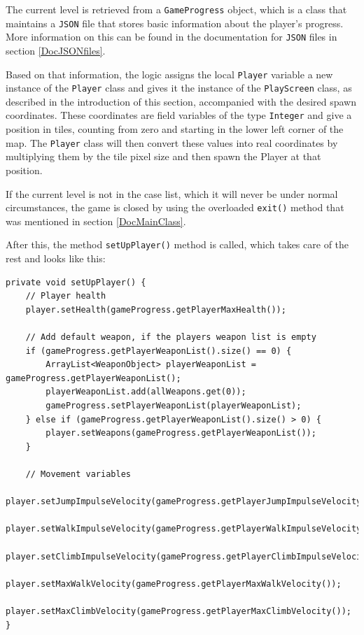 \documentclass[12p]{article}
\begin{document}
The current level is retrieved from a \texttt{GameProgress} object, which is a class that maintains a \texttt{JSON} file that stores basic information about the player's progress. More information on this can be found in the documentation for \texttt{JSON} files in section \ref{DocJSONfiles}.

Based on that information, the logic assigns the local \texttt{Player} variable a new instance of the \texttt{Player} class and gives it the instance of the \texttt{PlayScreen} class, as described in the introduction of this section, accompanied with the desired spawn coordinates. These coordinates are field variables of the type \texttt{Integer} and give a position in tiles, counting from zero and starting in the lower left corner of the map. The \texttt{Player} class will then convert these values into real coordinates by multiplying them by the tile pixel size and then spawn the Player at that position.

If the current level is not in the case list, which it will never be under normal circumstances, the game is closed by using the overloaded \texttt{exit()} method that was mentioned in section \ref{DocMainClass}.

After this, the method \texttt{setUpPlayer()} method is called, which takes care of the rest and looks like this:

\begin{verbatim}
private void setUpPlayer() {
    // Player health
    player.setHealth(gameProgress.getPlayerMaxHealth());

    // Add default weapon, if the players weapon list is empty
    if (gameProgress.getPlayerWeaponList().size() == 0) {
        ArrayList<WeaponObject> playerWeaponList = gameProgress.getPlayerWeaponList();
        playerWeaponList.add(allWeapons.get(0));
        gameProgress.setPlayerWeaponList(playerWeaponList);
    } else if (gameProgress.getPlayerWeaponList().size() > 0) {
        player.setWeapons(gameProgress.getPlayerWeaponList());
    }

    // Movement variables
    player.setJumpImpulseVelocity(gameProgress.getPlayerJumpImpulseVelocity());
    player.setWalkImpulseVelocity(gameProgress.getPlayerWalkImpulseVelocity());
    player.setClimbImpulseVelocity(gameProgress.getPlayerClimbImpulseVelocity());
    player.setMaxWalkVelocity(gameProgress.getPlayerMaxWalkVelocity());
    player.setMaxClimbVelocity(gameProgress.getPlayerMaxClimbVelocity());
}
\end{verbatim}
\end{document}
